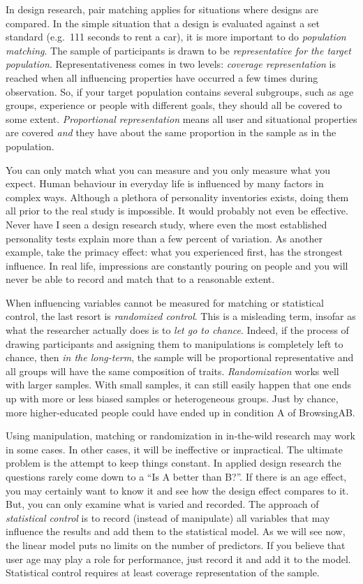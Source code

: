 \documentclass[]{svmono}
\begin{document}
In design research, pair matching applies for situations where designs
are compared. In the simple situation that a design is evaluated against
a set standard (e.g.~111 seconds to rent a car), it is more important to
do \emph{population matching}. The sample of participants is drawn to be
\emph{representative for the target population}. Representativeness
comes in two levels: \emph{coverage representation} is reached when all
influencing properties have occurred a few times during observation. So,
if your target population contains several subgroups, such as age
groups, experience or people with different goals, they should all be
covered to some extent. \emph{Proportional representation} means all
user and situational properties are covered \emph{and} they have about
the same proportion in the sample as in the population.

You can only match what you can measure and you only measure what you
expect. Human behaviour in everyday life is influenced by many factors
in complex ways. Although a plethora of personality inventories exists,
doing them all prior to the real study is impossible. It would probably
not even be effective. Never have I seen a design research study, where
even the most established personality tests explain more than a few
percent of variation. As another example, take the primacy effect: what
you experienced first, has the strongest influence. In real life,
impressions are constantly pouring on people and you will never be able
to record and match that to a reasonable extent.

When influencing variables cannot be measured for matching or
statistical control, the last resort is \emph{randomized control}. This
is a misleading term, insofar as what the researcher actually does is to
\emph{let go to chance}. Indeed, if the process of drawing participants
and assigning them to manipulations is completely left to chance, then
\emph{in the long-term}, the sample will be proportional representative
and all groups will have the same composition of traits.
\emph{Randomization} works well with larger samples. With small samples,
it can still easily happen that one ends up with more or less biased
samples or heterogeneous groups. Just by chance, more higher-educated
people could have ended up in condition A of BrowsingAB.

Using manipulation, matching or randomization in in-the-wild research
may work in some cases. In other cases, it will be ineffective or
impractical. The ultimate problem is the attempt to keep things
constant. In applied design research the questions rarely come down to a
``Is A better than B?''. If there is an age effect, you may certainly
want to know it and see how the design effect compares to it. But, you
can only examine what is varied and recorded. The approach of
\emph{statistical control} is to record (instead of manipulate) all
variables that may influence the results and add them to the statistical
model. As we will see now, the linear model puts no limits on the number
of predictors. If you believe that user age may play a role for
performance, just record it and add it to the model. Statistical control
requires at least coverage representation of the sample.
\end{document}
